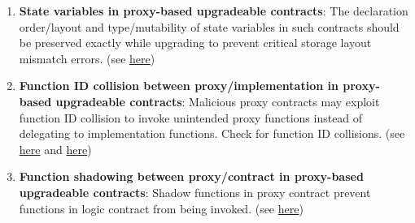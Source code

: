 \begin{enumerate}
\item\textbf{State variables in proxy-based upgradeable contracts}: The declaration order/layout and type/mutability of state variables in such contracts should be preserved exactly while upgrading to prevent critical storage layout mismatch errors. (see \href{https://docs.openzeppelin.com/upgrades-plugins/1.x/writing-upgradeable\#modifying-your-contracts}{here})

\item\textbf{Function ID collision between proxy/implementation in proxy-based upgradeable contracts}: Malicious proxy contracts may exploit function ID collision to invoke unintended proxy functions instead of delegating to implementation functions. Check for function ID collisions. (see \href{https://github.com/crytic/slither/wiki/Upgradeability-Checks\#functions-ids-collisions}{here} and \href{https://forum.openzeppelin.com/t/beware-of-the-proxy-learn-how-to-exploit-function-clashing/1070}{here})

\item\textbf{Function shadowing between proxy/contract in proxy-based upgradeable contracts}: Shadow functions in proxy contract prevent functions in logic contract from being invoked. (see \href{https://github.com/crytic/slither/wiki/Upgradeability-Checks\#functions-shadowing}{here})

\end{enumerate}
